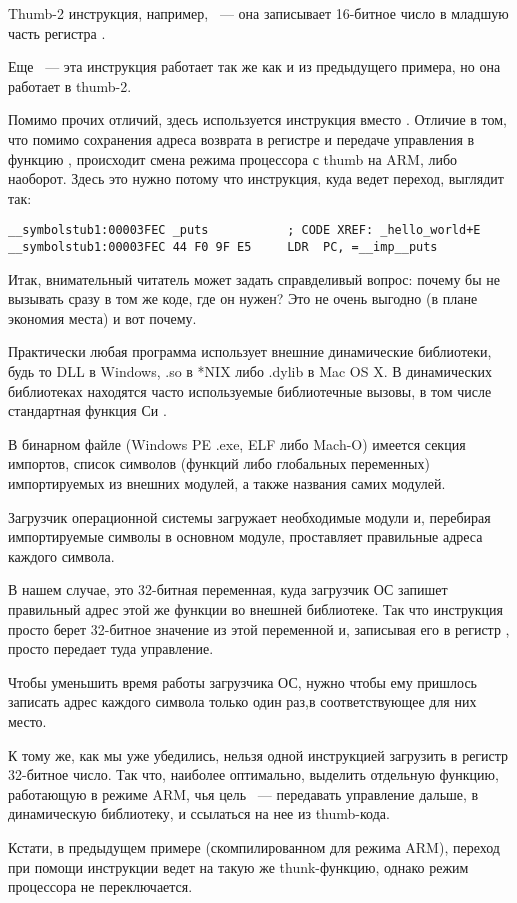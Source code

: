 Thumb-2 инструкция, например,  ~--- она записывает 16-битное число в 
младшую часть регистра .

Еще  ~--- эта инструкция работает так же как и  из предыдущего примера, 
но она работает в thumb-2.

Помимо прочих отличий, здесь используется инструкция  вместо . 
Отличие в том, что помимо сохранения адреса возврата в регистре \LR и передаче управления в функцию \puts, происходит смена режима процессора с thumb на ARM, либо наоборот.
Здесь это нужно потому что инструкция, куда ведет переход, выглядит так:

\begin{lstlisting}
__symbolstub1:00003FEC _puts           ; CODE XREF: _hello_world+E
__symbolstub1:00003FEC 44 F0 9F E5     LDR  PC, =__imp__puts
\end{lstlisting}

Итак, внимательный читатель может задать справделивый вопрос: почему бы не вызывать  сразу в том же коде,
где он нужен? Это не очень выгодно (в плане экономия места) и вот почему. 

Практически любая программа использует внешние динамические библиотеки, будь то DLL в Windows, .so в *NIX либо .dylib в Mac OS X. В динамических библиотеках
находятся часто используемые библиотечные вызовы, в том числе стандартная функция Си . 

В бинарном файле (Windows PE .exe, ELF либо Mach-O) имеется секция импортов, список символов (функций либо глобальных переменных) импортируемых из внешних модулей, а также названия самих модулей. 

Загрузчик операционной системы загружает необходимые модули и, перебирая импортируемые символы в основном модуле, проставляет правильные адреса каждого символа.

В нашем случае,  это 32-битная переменная, куда загрузчик ОС запишет правильный адрес этой же функции во внешней библиотеке. Так что инструкция  просто берет 32-битное значение из этой переменной и, записывая его в регистр , просто передает туда управление. 

Чтобы уменьшить время работы загрузчика ОС, нужно чтобы ему пришлось записать адрес каждого символа только один раз,в соответствующее для них место.

К тому же, как мы уже убедились, нельзя одной инструкцией загрузить в регистр 32-битное число.
Так что, наиболее оптимально, выделить отдельную функцию, работающую в режиме ARM, чья цель ~--- передавать
управление дальше, в динамическую библиотеку, и ссылаться на нее из thumb-кода.

Кстати, в предыдущем примере (скомпилированном для режима ARM), переход при помощи инструкции  ведет 
на такую же thunk-функцию, однако режим процессора не переключается.

